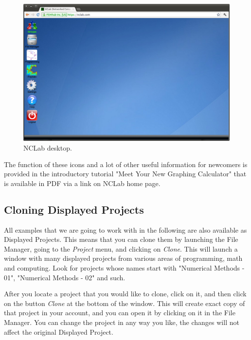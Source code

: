\documentclass[article,A4,12pt]{llncs}
\begin{document}
\begin{figure}[!ht]
\begin{center}
\includegraphics[width=\textwidth]{img/desktop.png}
\end{center}
\caption{NCLab desktop.}
\label{fig:desktop}
\vspace{-1cm}
\end{figure}
\newpage
\noindent
The function of these icons and a lot of other useful information for newcomers is provided 
in the introductory tutorial "Meet Your New Graphing Calculator" that is available in 
PDF via a link on NCLab home page. \\

\subsection{Cloning Displayed Projects}

All examples that we are going to work with in the following are also available 
as Displayed Projects. This means that you can clone them by launching the File
Manager, going to the {\em Project} menu, and clicking on {\em Clone}. This will launch 
a window with many displayed projects from various areas of programming,
math and computing. Look for projects whose names start with "Numerical Methods - 01",
"Numerical Methods - 02" and such.

After you locate a project that you would like to clone, click on it,
and then click on the button {\em Clone} at the bottom of the window. This will
create exact copy of that project in your account, and you can open it 
by clicking on it in the File Manager. You can change the project in any way 
you like, the changes will not affect the original Displayed Project. 
\end{document}
